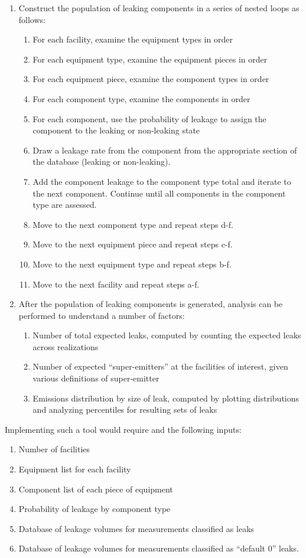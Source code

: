 \documentclass[11pt]{report}
\begin{document}
\begin{enumerate}
\item Construct the population of leaking components in a series of nested loops as follows:
	\begin{enumerate}
	\item For each facility, examine the equipment types in order
	\item For each equipment type, examine the equipment pieces in order
	\item For each equipment piece, examine the component types in order
	\item For each component type, examine the components in order
	\item For each component, use the probability of leakage to assign the component to the leaking or non-leaking state
	\item Draw a leakage rate from the component from the appropriate section of the database (leaking or non-leaking). 
	\item Add the component leakage to the component type total and iterate to the next component. Continue until all components in 	the component type are assessed.
	\item Move to the next component type and repeat steps d-f.
	\item Move to the next equipment piece and repeat steps c-f.
	\item Move to the next equipment type and repeat steps b-f.
	\item Move to the next facility and repeat steps a-f.
	\end{enumerate}
\item After the population of leaking components is generated, analysis can be performed to understand a number of factors:
	\begin{enumerate}
	\item Number of total expected leaks, computed by counting the expected leaks across realizations
	\item Number of expected ``super-emitters'' at the facilities of interest, given various definitions of super-emitter
	\item Emissions distribution by size of leak, computed by plotting distributions and analyzing percentiles for resulting sets of leaks
	\end{enumerate}
\end{enumerate}

Implementing such a tool would require and the following inputs: 
\begin{enumerate}
\item	Number of facilities
\item	Equipment list for each facility
\item Component list of each piece of equipment
\item Probability of leakage by component type
\item Database of leakage volumes for measurements classified as leaks
\item Database of leakage volumes for measurements classified as ``default 0'' leaks.
\end{enumerate}
\end{document}
